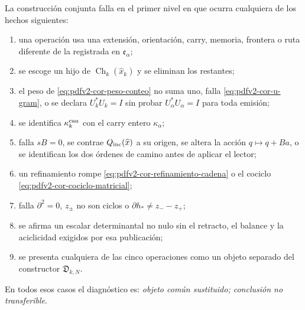 \begin{criterion}
\label{crit:pdfv2-cor-falsadores}
La construcción conjunta falla en el primer nivel en que ocurra cualquiera de
los hechos siguientes:
\begin{enumerate}
 \item una operación usa una extensión, orientación, carry, memoria, frontera
 o ruta diferente de la registrada en \(\mathfrak e_\alpha\);
 \item se escoge un hijo de
 \(\operatorname{Ch}_k(\widehat x_k)\) y se eliminan los restantes;
 \item el peso de \eqref{eq:pdfv2-cor-peso-conteo} no suma uno, falla
 \eqref{eq:pdfv2-cor-u-gram}, o se declara \(U_k^*U_k=I\) sin probar
 \(U_\alpha^*U_\alpha=I\) para toda emisión;
 \item se identifica \(\kappa_k^{\rm can}\) con el carry entero
 \(\kappa_\alpha\);
 \item falla \(sB=0\), se contrae
 \(Q_{\rm inc}(\widehat x)\) a su origen, se altera la acción
 \(q\mapsto q+Ba\), o se identifican los dos órdenes de camino antes de
 aplicar el lector;
 \item un refinamiento rompe
 \eqref{eq:pdfv2-cor-refinamiento-cadena} o el cociclo
 \eqref{eq:pdfv2-cor-cociclo-matricial};
 \item falla \(\partial^2=0\), \(z_\pm\) no son ciclos o
 \(\partial h_*\neq z_--z_+\);
 \item se afirma un escalar determinantal no nulo sin el retracto, el
 balance y la aciclicidad exigidos por esa publicación;
 \item se presenta cualquiera de las cinco operaciones como un objeto
 separado del constructor \(\mathfrak D_{k,N}\).
\end{enumerate}
En todos esos casos el diagnóstico es: \emph{objeto común sustituido;
conclusión no transferible}.
\end{criterion}
